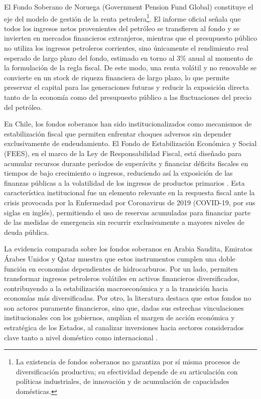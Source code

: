 \documentclass[../../TFM.tex]{subfiles}
\begin{document}
	El Fondo Soberano de Noruega (Government Pension Fund Global) constituye el eje del modelo de gestión de la renta petrolera\footnote{La existencia de fondos soberanos no garantiza por sí misma procesos de diversificación productiva; su efectividad depende de su articulación con políticas industriales, de innovación y de acumulación de capacidades domésticas.}. El informe oficial \textcite{NOU2015} señala que todos los ingresos netos provenientes del petróleo se transfieren al fondo y se invierten en mercados financieros extranjeros, mientras que el presupuesto público no utiliza los ingresos petroleros corrientes, sino únicamente el rendimiento real esperado de largo plazo del fondo, estimado en torno al 3\% anual al momento de la formulación de la regla fiscal. De este modo, una renta volátil y no renovable se convierte en un stock de riqueza financiera de largo plazo, lo que permite preservar el capital para las generaciones futuras y reducir la exposición directa tanto de la economía como del presupuesto público a las fluctuaciones del precio del petróleo.
	
	En Chile, los fondos soberanos han sido institucionalizados como mecanismos de estabilización fiscal que permiten enfrentar choques adversos sin depender exclusivamente de endeudamiento. El Fondo de Estabilización Económica y Social (FEES), en el marco de la Ley de Responsabilidad Fiscal, está diseñado para acumular recursos durante períodos de superávits y financiar déficits fiscales en tiempos de bajo crecimiento o ingresos, reduciendo así la exposición de las finanzas públicas a la volatilidad de los ingresos de productos primarios \parencite{OECD2020}. Esta característica institucional fue un elemento relevante en la respuesta fiscal ante la crisis provocada por la Enfermedad por Coronavirus de 2019 (COVID-19, por sus siglas en inglés), permitiendo el uso de reservas acumuladas para financiar parte de las medidas de emergencia sin recurrir exclusivamente a mayores niveles de deuda pública.
	
	La evidencia comparada sobre los fondos soberanos en Arabia Saudita, Emiratos Árabes Unidos y Qatar muestra que estos instrumentos cumplen una doble función en economías dependientes de hidrocarburos. Por un lado, permiten transformar ingresos petroleros volátiles en activos financieros diversificados, contribuyendo a la estabilización macroeconómica y a la transición hacia economías más diversificadas. Por otro, la literatura destaca que estos fondos no son actores puramente financieros, sino que, dadas sus estrechas vinculaciones institucionales con los gobiernos, amplían el margen de acción económica y estratégica de los Estados, al canalizar inversiones hacia sectores considerados clave tanto a nivel doméstico como internacional \parencite{Roll2026}.
	
\end{document}

